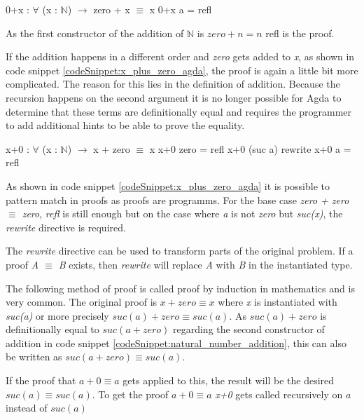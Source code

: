 \begin{codesnippet}[mathescape=true, caption={Proof of addition to zero in Agda}, label={codeSnippet:zero_plus_x_agda}]
0+x : $\forall$ (x : $\mathbb{N}$) $\rightarrow$ zero + x $\equiv$ x
0+x a = refl
\end{codesnippet}

As the first constructor of the addition of $\mathbb{N}$ is $zero + n = n$ refl is the proof.

If the addition happens in a different order and \emph{zero} gets added to \emph{x}, as shown in code snippet \ref{codeSnippet:x_plus_zero_agda}, the proof is again a little bit more complicated. 
The reason for this lies in the definition of addition.
Because the recursion happens on the second argument it is no longer possible for Agda to determine that these terms are definitionally equal and requires the programmer to add additional hints to be able to prove the equality.

\begin{codesnippet}[mathescape=true, caption={Proof of addition of zero in Agda}, label={codeSnippet:x_plus_zero_agda}]
x+0 : $\forall$ (x : $\mathbb{N}$) $\rightarrow$ x + zero $\equiv$ x
x+0 zero = refl
x+0 (suc a) rewrite x+0 a = refl
\end{codesnippet}

As shown in code snippet \ref{codeSnippet:x_plus_zero_agda} it is possible to pattern match in proofs as proofs are programms.
For the base case \emph{zero + zero $\equiv$ zero}, \emph{refl} is still enough but on the case where \emph{a} is not \emph{zero} but \emph{suc(x)}, the \emph{rewrite} directive is required.

The \emph{rewrite} directive can be used to transform parts of the original problem. If a proof \emph{A $\equiv$ B} exists, then \emph{rewrite} will replace \emph{A} with \emph{B} in the instantiated type.

The following method of proof is called proof by induction in mathematics and is very common.
The original proof is $x + zero \equiv x$ where \emph{x} is instantiated with \emph{suc(a)} or more precisely $suc(a) + zero \equiv suc(a)$.
As $suc(a) + zero$ is definitionally equal to $suc(a + zero)$ regarding the second constructor of addition in code snippet \ref{codeSnippet:natural_number_addition}, this can also be written as $suc(a + zero) \equiv suc(a)$.

If the proof that $a + 0 \equiv a$ gets applied to this, the result will be the desired $suc(a) \equiv suc(a)$. 
To get the proof $a + 0 \equiv a$ \emph{x+0} gets called recursively on $a$ instead of $suc(a)$

